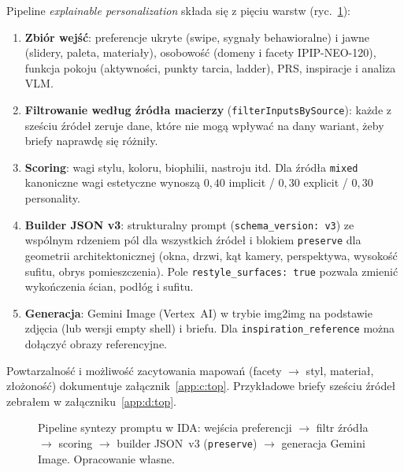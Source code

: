 Pipeline \emph{explainable personalization} składa się z pięciu warstw (ryc.~\ref{fig:ch07:pipeline}):

\begin{enumerate}
  \item \textbf{Zbiór wejść}: preferencje ukryte (swipe, sygnały behawioralne) i jawne (slidery, paleta, materiały), osobowość (domeny i facety IPIP-NEO-120), funkcja pokoju (aktywności, punkty tarcia, ladder), PRS, inspiracje i analiza VLM.
  \item \textbf{Filtrowanie według źródła macierzy} (\texttt{filterInputsBySource}): każde z sześciu źródeł zeruje dane, które nie mogą wpływać na dany wariant, żeby briefy naprawdę się różniły.
  \item \textbf{Scoring}: wagi stylu, koloru, biophilii, nastroju itd. Dla źródła \texttt{mixed} kanoniczne wagi estetyczne wynoszą $0{,}40$ implicit / $0{,}30$ explicit / $0{,}30$ personality.
  \item \textbf{Builder JSON v3}: strukturalny prompt (\texttt{schema\_version: v3}) ze wspólnym rdzeniem pól dla wszystkich źródeł i blokiem \texttt{preserve} dla geometrii architektonicznej (okna, drzwi, kąt kamery, perspektywa, wysokość sufitu, obrys pomieszczenia). Pole \texttt{restyle\_surfaces: true} pozwala zmienić wykończenia ścian, podłóg i sufitu.
  \item \textbf{Generacja}: Gemini Image (Vertex~AI) w trybie img2img na podstawie zdjęcia (lub wersji empty shell) i briefu. Dla \texttt{inspiration\_reference} można dołączyć obrazy referencyjne.
\end{enumerate}

Powtarzalność i możliwość zacytowania mapowań (facety $\rightarrow$ styl, materiał, złożoność) dokumentuje załącznik~\ref{app:c:top}. Przykładowe briefy sześciu źródeł zebrałem w załączniku~\ref{app:d:top}.

\begin{figure}[htbp]
  \centering
  \caption{Pipeline syntezy promptu w IDA: wejścia preferencji $\rightarrow$ filtr źródła $\rightarrow$ scoring $\rightarrow$ builder JSON~v3 (\texttt{preserve}) $\rightarrow$ generacja Gemini Image. Opracowanie własne.}
  \label{fig:ch07:pipeline}
\end{figure}

